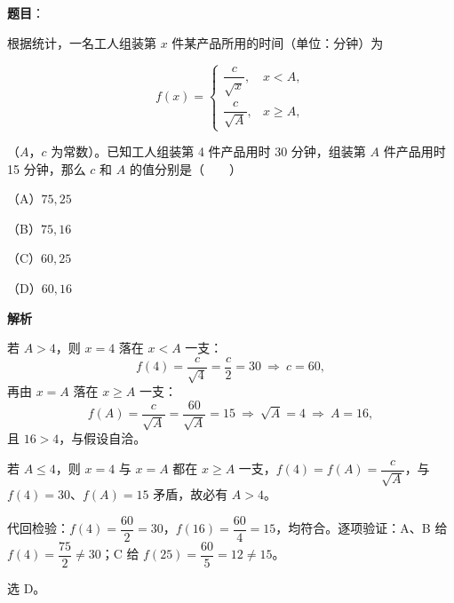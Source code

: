 \begin{answer}

\textbf{题目}：

根据统计，一名工人组装第 $x$ 件某产品所用的时间（单位：分钟）为

\nopagebreak[4]
\[
f(x)=\begin{cases}\dfrac{c}{\sqrt{x}},&x<A,\\[3mm]\dfrac{c}{\sqrt{A}},&x\geqslant A,\end{cases}
\]

（$A$，$c$ 为常数）。已知工人组装第 4 件产品用时 30 分钟，组装第 $A$ 件产品用时 15 分钟，那么 $c$ 和 $A$ 的值分别是\mbox{（　　）}

（A）$75,25$

（B）$75,16$

（C）$60,25$

（D）$60,16$

\textbf{解析}

若 $A>4$，则 $x=4$ 落在 $x<A$ 一支：
\nopagebreak[4]
\[
f(4)=\frac{c}{\sqrt4}=\frac c2=30\ \Longrightarrow\ c=60,
\]
再由 $x=A$ 落在 $x\geqslant A$ 一支：
\nopagebreak[4]
\[
f(A)=\frac{c}{\sqrt A}=\frac{60}{\sqrt A}=15\ \Longrightarrow\ \sqrt A=4\ \Longrightarrow\ A=16,
\]
且 $16>4$，与假设自洽。

若 $A\leqslant4$，则 $x=4$ 与 $x=A$ 都在 $x\geqslant A$ 一支，$f(4)=f(A)=\dfrac{c}{\sqrt A}$，与 $f(4)=30$、$f(A)=15$ 矛盾，故必有 $A>4$。

代回检验：$f(4)=\dfrac{60}{2}=30$，$f(16)=\dfrac{60}{4}=15$，均符合。逐项验证：A、B 给 $f(4)=\dfrac{75}{2}\neq30$；C 给 $f(25)=\dfrac{60}{5}=12\neq15$。

选 D。


\end{answer}
